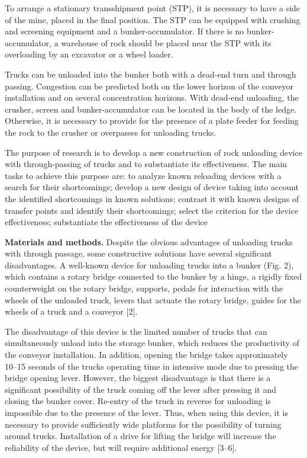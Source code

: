 \begin{multicols}{2}
To arrange a stationary transshipment point (STP), it is necessary to
have a side of the mine, placed in the final position. The STP can be
equipped with crushing and screening equipment and a bunker-accumulator.
If there is no bunker-accumulator, a warehouse of rock should be placed
near the STP with its overloading by an excavator or a wheel loader.

Trucks can be unloaded into the bunker both with a dead-end turn and
through passing. Congestion can be predicted both on the lower horizon
of the conveyor installation and on several concentration horizons. With
dead-end unloading, the crusher, screen and bunker-accumulator can be
located in the body of the ledge. Otherwise, it is necessary to provide
for the presence of a plate feeder for feeding the rock to the crusher
or overpasses for unloading trucks.

The purpose of research is to develop a new construction of rock
unloading device with through-passing of trucks and to substantiate its
effectiveness. The main tasks to achieve this purpose are: to analyze
known reloading devices with a search for their shortcomings; develop a
new design of device taking into account the identified shortcomings in
known solutions; contrast it with known designs of transfer points and
identify their shortcomings; select the criterion for the device
effectiveness; substantiate the effectiveness of the device

{\bfseries Materials and methods.} Despite the obvious advantages of
unloading trucks with through passage, some constructive solutions have
several significant disadvantages. A well-known device for unloading
trucks into a bunker (Fig. 2), which contains a rotary bridge connected
to the bunker by a hinge, a rigidly fixed counterweight on the rotary
bridge, supports, pedals for interaction with the wheels of the unloaded
truck, levers that actuate the rotary bridge, guides for the wheels of a
truck and a conveyor {[}2{]}.

The disadvantage of this device is the limited number of trucks that can
simultaneously unload into the storage bunker, which reduces the
productivity of the conveyor installation. In addition, opening the
bridge takes approximately 10--15 seconds of the truck\textquotesingle s
operating time in intensive mode due to pressing the bridge opening
lever. However, the biggest disadvantage is that there is a significant
possibility of the truck coming off the lever after pressing it and
closing the bunker cover. Re-entry of the truck in reverse for unloading
is impossible due to the presence of the lever. Thus, when using this
device, it is necessary to provide sufficiently wide platforms for the
possibility of turning around trucks. Installation of a drive for
lifting the bridge will increase the reliability of the device, but will
require additional energy {[}3--6{]}.
\end{multicols}

